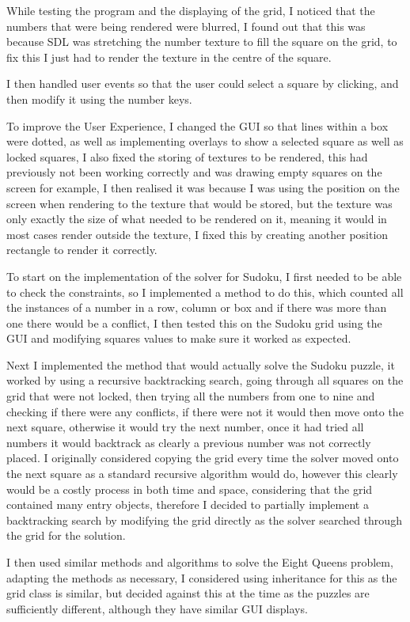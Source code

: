 \documentclass[]{final_report}
\begin{document}
While testing the program and the displaying of the grid, I noticed that the numbers that were being rendered were blurred, I found out that this was because SDL was stretching the number texture to fill the square on the grid, to fix this I just had to render the texture in the centre of the square.

I then handled user events so that the user could select a square by clicking, and then modify it using the number keys.

To improve the User Experience, I changed the GUI so that lines within a box were dotted, as well as implementing overlays to show a selected square as well as locked squares, I also fixed the storing of textures to be rendered, this had previously not been working correctly and was drawing empty squares on the screen for example, I then realised it was because I was using the position on the screen when rendering to the texture that would be stored, but the texture was only exactly the size of what needed to be rendered on it, meaning it would in most cases render outside the texture, I fixed this by creating another position rectangle to render it correctly.

To start on the implementation of the solver for Sudoku, I first needed to be able to check the constraints, so I implemented a method to do this, which counted all the instances of a number in a row, column or box and if there was more than one there would be a conflict, I then tested this on the Sudoku grid using the GUI and modifying squares values to make sure it worked as expected.

Next I implemented the method that would actually solve the Sudoku puzzle, it worked by using a recursive backtracking search, going through all squares on the grid that were not locked, then trying all the numbers from one to nine and checking if there were any conflicts, if there were not it would then move onto the next square, otherwise it would try the next number, once it had tried all numbers it would backtrack as clearly a previous number was not correctly placed. I originally considered copying the grid every time the solver moved onto the next square as a standard recursive algorithm would do, however this clearly would be a costly process in both time and space, considering that the grid contained many entry objects, therefore I decided to partially implement a backtracking search by modifying the grid directly as the solver searched through the grid for the solution.

I then used similar methods and algorithms to solve the Eight Queens problem, adapting the methods as necessary, I considered using inheritance for this as the grid class is similar, but decided against this at the time as the puzzles are sufficiently different, although they have similar GUI displays.
\end{document}
